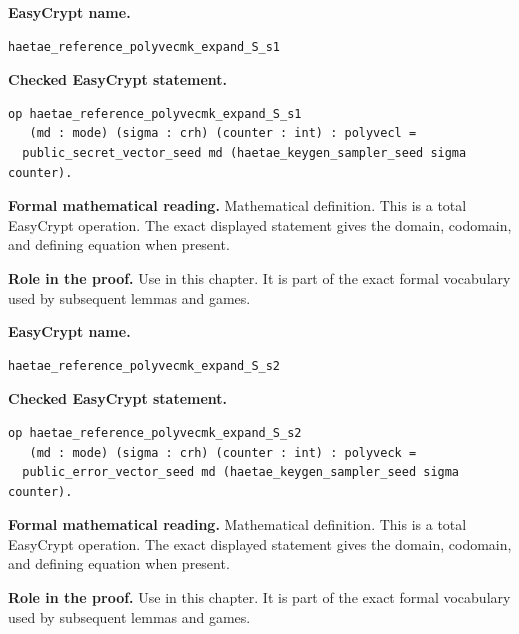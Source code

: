 \begin{formaldefinition}
\noindent\textbf{EasyCrypt name.}
\begin{lstlisting}[language=EasyCrypt,basicstyle=\ttfamily\scriptsize]
haetae_reference_polyvecmk_expand_S_s1
\end{lstlisting}
\noindent\textbf{Checked EasyCrypt statement.}
\begin{lstlisting}[language=EasyCrypt,basicstyle=\ttfamily\scriptsize]
op haetae_reference_polyvecmk_expand_S_s1
   (md : mode) (sigma : crh) (counter : int) : polyvecl =
  public_secret_vector_seed md (haetae_keygen_sampler_seed sigma counter).
\end{lstlisting}
\noindent\textbf{Formal mathematical reading.}
Mathematical definition. This is a total EasyCrypt operation.  The exact displayed statement gives the domain, codomain, and defining equation when present.

\noindent\textbf{Role in the proof.}
Use in this chapter. It is part of the exact formal vocabulary used by subsequent lemmas and games.

\end{formaldefinition}

\begin{formaldefinition}
\noindent\textbf{EasyCrypt name.}
\begin{lstlisting}[language=EasyCrypt,basicstyle=\ttfamily\scriptsize]
haetae_reference_polyvecmk_expand_S_s2
\end{lstlisting}
\noindent\textbf{Checked EasyCrypt statement.}
\begin{lstlisting}[language=EasyCrypt,basicstyle=\ttfamily\scriptsize]
op haetae_reference_polyvecmk_expand_S_s2
   (md : mode) (sigma : crh) (counter : int) : polyveck =
  public_error_vector_seed md (haetae_keygen_sampler_seed sigma counter).
\end{lstlisting}
\noindent\textbf{Formal mathematical reading.}
Mathematical definition. This is a total EasyCrypt operation.  The exact displayed statement gives the domain, codomain, and defining equation when present.

\noindent\textbf{Role in the proof.}
Use in this chapter. It is part of the exact formal vocabulary used by subsequent lemmas and games.

\end{formaldefinition}

